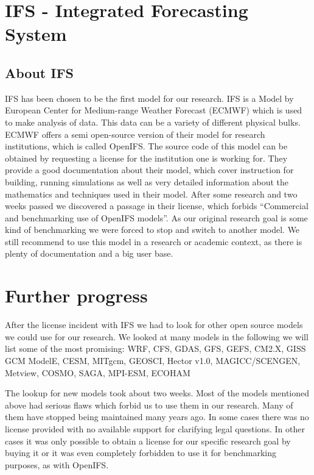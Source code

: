 \documentclass[]{article}
\begin{document}
\pagebreak

\section{IFS - Integrated Forecasting
System}\label{ifs---integrated-forecasting-system}

\subsection{About IFS}\label{about-ifs}

IFS has been chosen to be the first model for our research. IFS is a
Model by European Center for Medium-range Weather Forecast (ECMWF) which
is used to make analysis of data. This data can be a variety of
different physical bulks. ECMWF offers a semi open-source version of
their model for research institutions, which is called OpenIFS. The
source code of this model can be obtained by requesting a license for
the institution one is working for. They provide a good documentation
about their model, which cover instruction for building, running
simulations as well as very detailed information about the mathematics
and techniques used in their model. After some research and two weeks
passed we discovered a passage in their license, which forbids
``Commercial and benchmarking use of OpenIFS models''. As our original
research goal is some kind of benchmarking we were forced to stop and
switch to another model. We still recommend to use this model in a
research or academic context, as there is plenty of documentation and a
big user base.

\section{Further progress}\label{further-progress}

After the license incident with IFS we had to look for other open source
models we could use for our research. We looked at many models in the
following we will list some of the most promising: WRF, CFS, GDAS, GFS,
GEFS, CM2.X, GISS GCM ModelE, CESM, MITgcm, GEOSCI, Hector v1.0,
MAGICC/SCENGEN, Metview, COSMO, SAGA, MPI-ESM, ECOHAM

The lookup for new models took about two weeks. Most of the models
mentioned above had serious flaws which forbid us to use them in our
research. Many of them have stopped being maintained many years ago. In
some cases there was no license provided with no available support for
clarifying legal questions. In other cases it was only possible to
obtain a license for our specific research goal by buying it or it was
even completely forbidden to use it for benchmarking purposes, as with
OpenIFS.
\end{document}
